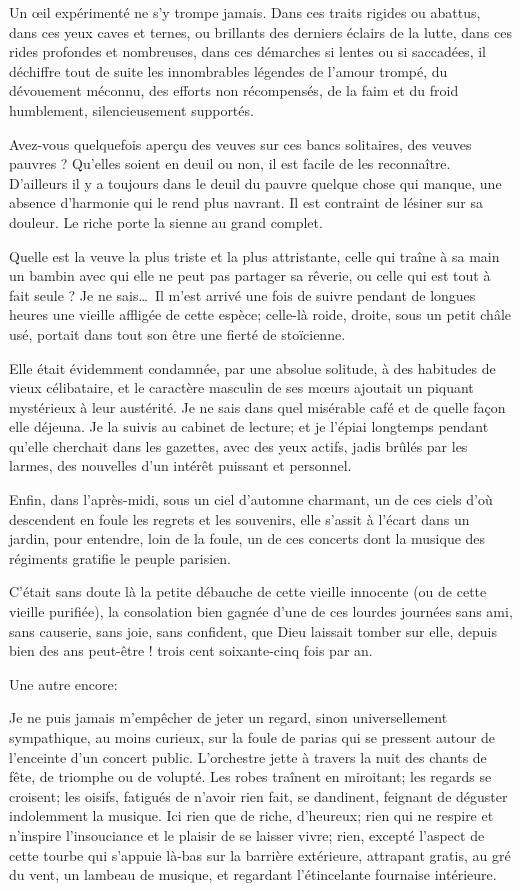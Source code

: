 Un \oe il expérimenté ne s’y trompe jamais. Dans ces
traits rigides ou abattus, dans ces yeux caves et ternes, ou brillants
des derniers éclairs de la lutte, dans ces rides profondes et
nombreuses, dans ces démarches si lentes ou si saccadées, il déchiffre
tout de suite les innombrables légendes de l’amour
trompé, du dévouement méconnu, des efforts non récompensés, de la faim
et du froid humblement, silencieusement supportés.

Avez{}-vous quelquefois aperçu des veuves sur ces bancs solitaires, des
veuves pauvres ? Qu’elles soient en deuil ou non, il
est facile de les reconnaître. D’ailleurs il y a
toujours dans le deuil du pauvre quelque chose qui manque, une absence
d’harmonie qui le rend plus navrant. Il est contraint
de lésiner sur sa douleur. Le riche porte la sienne au grand complet.

Quelle est la veuve la plus triste et la plus attristante, celle qui
traîne à sa main un bambin avec qui elle ne peut pas partager sa
rêverie, ou celle qui est tout à fait seule ? Je ne sais\ldots\ Il
m’est arrivé une fois de suivre pendant de longues
heures une vieille affligée de cette espèce; celle{}-là roide, droite,
sous un petit châle usé, portait dans tout son être une fierté de
stoïcienne.

Elle était évidemment condamnée, par une absolue solitude, à des
habitudes de vieux célibataire, et le caractère masculin de ses m\oe urs
ajoutait un piquant mystérieux à leur austérité. Je ne sais dans quel
misérable café et de quelle façon elle déjeuna. Je la suivis au cabinet
de lecture; et je l’épiai longtemps pendant
qu’elle cherchait dans les gazettes, avec des yeux
actifs, jadis brûlés par les larmes, des nouvelles
d’un intérêt puissant et personnel.

Enfin, dans l’après{}-midi, sous un ciel
d’automne charmant, un de ces ciels
d’où descendent en foule les regrets et les souvenirs,
elle s’assit à l’écart dans un
jardin, pour entendre, loin de la foule, un de ces concerts dont la
musique des régiments gratifie le peuple parisien.

C’était sans doute là la petite débauche de cette
vieille innocente (ou de cette vieille purifiée), la consolation bien
gagnée d’une de ces lourdes journées sans ami, sans
causerie, sans joie, sans confident, que Dieu laissait tomber sur elle,
depuis bien des ans peut{}-être ! trois cent soixante{}-cinq fois par
an.

Une autre encore:

Je ne puis jamais m’empêcher de jeter un regard, sinon
universellement sympathique, au moins curieux, sur la foule de parias
qui se pressent autour de l’enceinte
d’un concert public. L’orchestre
jette à travers la nuit des chants de fête, de triomphe ou de volupté.
Les robes traînent en miroitant; les regards se croisent; les oisifs,
fatigués de n’avoir rien fait, se dandinent, feignant
de déguster indolemment la musique. Ici rien que de riche,
d’heureux; rien qui ne respire et
n’inspire l’insouciance et le plaisir
de se laisser vivre; rien, excepté l’aspect de cette
tourbe qui s’appuie là{}-bas sur la barrière
extérieure, attrapant gratis, au gré du vent, un lambeau de musique, et
regardant l’étincelante fournaise intérieure.

